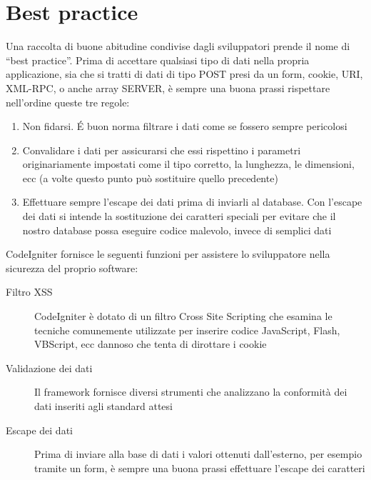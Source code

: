 \section*{Best practice}
Una raccolta di buone abitudine condivise dagli sviluppatori prende il nome di ``best practice''. Prima di accettare qualsiasi tipo di dati nella propria applicazione, sia che si tratti di dati di tipo POST presi da un form, cookie, URI, XML-RPC, o anche array SERVER, è sempre una buona prassi rispettare nell'ordine queste tre regole:

\begin{enumerate}
\item Non fidarsi. \'E buon norma filtrare i dati come se fossero sempre pericolosi
\item Convalidare i dati per assicurarsi che essi rispettino i parametri originariamente impostati come il tipo corretto, la lunghezza, le dimensioni, ecc (a volte questo punto può sostituire quello precedente)
\item Effettuare sempre l'escape dei dati prima di inviarli al database. Con l'escape dei dati si intende la sostituzione dei caratteri speciali per evitare che il nostro database possa eseguire codice malevolo, invece di semplici dati
\end{enumerate}

CodeIgniter fornisce le seguenti funzioni per assistere lo sviluppatore nella sicurezza del proprio software:

\begin{description}
\item[Filtro XSS] CodeIgniter è dotato di un filtro Cross Site Scripting che esamina le tecniche comunemente utilizzate per inserire codice JavaScript, Flash, VBScript, ecc dannoso che tenta di dirottare i cookie 
\item[Validazione dei dati] Il framework fornisce diversi strumenti che analizzano la conformità dei dati inseriti agli standard attesi
\item[Escape dei dati] Prima di inviare alla base di dati i valori ottenuti dall'esterno, per esempio tramite un form, è sempre una buona prassi effettuare l'escape dei caratteri
\end{description}

